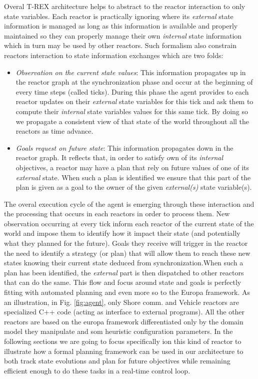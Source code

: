 Overal T-REX architecture helps to abstract to the reactor interaction
to only state variables. Each reactor is practically ignoring where
its {\em external} state information is managed as long as this
information is available and properly maintained so they can properly 
manage their own {\em internal} state information which in turn may be
used by other reactors. Such formalism also constrain reactors
interaction to state information exchanges which are two folds:
\begin{itemize}
\item {\em Observation on the current state values}: This information
  propagates up in the reactor graph at the synchronization phase 
  and occur at the beginning of every time steps (called
  ticks). During this phase the agent provides to each reactor 
  updates on their {\em external} state variables for this tick and
  ask them to compute their {\em internal} state variables values for
  this same tick. By doing so we propagate a consistent view of that
  state of the world throughout all the reactors as time advance.
\item {\em Goals request on future state}: This information propagates
  down in the reactor graph. It reflects that, in order to satisfy own
  of its {\em internal} objectives, a reactor may have a plan that
  rely on future values of one of its {\em external} state. When such
  a plan is identified we ensure that this part of the plan is given
  as a goal to the owner of the given {\em external(s)} state variable(s). 
\end{itemize}

The overal execution cycle of the agent is emerging through these
interaction and the processing that occurs in each reactors in order
to process them. New observation occurring at every tick inform each
reactor of the current state of the world and impose them to identify
how it impact their state (and potentially what they planned for the
future). Goals they receive will trigger in the reactor the need to
identify a strategy (or plan) that will allow them to reach these new
states knowing their current state deduced from synchronization.When
such a plan has been identified, the {\em external}  part is then
dispatched to other reactors that can do the same. This flow and focus
around state and goals is perfectly fitting with automated planning
and even more so to the Europa framework. As an illustration, in 
 Fig. \ref{fig:agent}, only \textsf{Shore comm.} and \textsf{Vehicle}
 reactors are specialized C++ code (acting as interface to external
 programs). All the other reactors are based on the europa framework
 differentiated only by the domain model they manipulate and som
 heuristic configuration parameters. In the following sections we are
 going to focus specifically ion this kind of reactor to illustrate
 how  a formal planning framework can be used in our architecture to
 both track state evolutions and plan for future objectives while
 remaining efficient enough to do these tasks in a real-time control 
loop.

